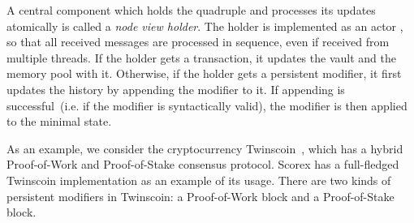 A central component which holds the quadruple {\em <history, minimal state, vault, memory pool>} and processes its updates atomically is called a {\em node view holder}. The holder is implemented as an actor , so that all received messages are processed in sequence, even if received from multiple threads. If the holder gets a transaction, it updates the vault and the memory pool with it. Otherwise, if the holder gets a persistent modifier, it first updates the history by appending the modifier to it. If appending is successful~(i.e. if the modifier is syntactically valid), the modifier is then applied to the minimal state.  

As an example, we consider the cryptocurrency Twinscoin~\cite{chepurnoy2017twinscoin}, which has a hybrid Proof-of-Work and Proof-of-Stake consensus protocol. Scorex has a full-fledged Twinscoin implementation as an example of its usage. There are two kinds of persistent modifiers in Twinscoin: a Proof-of-Work block and a Proof-of-Stake block. 
